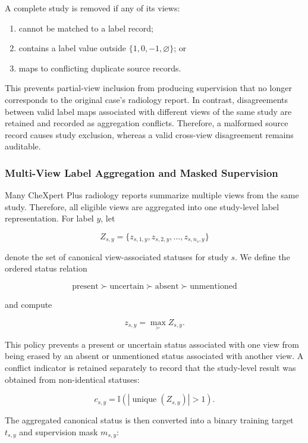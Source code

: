 A complete study is removed if any of its views:

\begin{enumerate}
    \item cannot be matched to a label record;
    \item contains a label value outside $\{1,0,-1,\varnothing\}$; or
    \item maps to conflicting duplicate source records.
\end{enumerate}

This prevents partial-view inclusion from producing supervision that no longer corresponds to the original case's radiology report. In contrast, disagreements between valid label maps associated with different views of the same study are retained and recorded as aggregation conflicts. Therefore, a malformed source record causes study exclusion, whereas a valid cross-view disagreement remains auditable.

\subsubsection{Multi-View Label Aggregation and Masked Supervision}

Many CheXpert Plus radiology reports summarize multiple views from the same study. Therefore, all eligible views are aggregated into one study-level label representation. For label $y$, let

\[
Z_{s,y}=\{z_{s,1,y},z_{s,2,y},\ldots,z_{s,n_s,y}\}
\]

denote the set of canonical view-associated statuses for study $s$. We define the ordered status relation

\[
\mathrm{present}\succ\mathrm{uncertain}\succ
\mathrm{absent}\succ\mathrm{unmentioned}
\]

and compute

\[
z_{s,y}=\max_{\succ}Z_{s,y}.
\]

This policy prevents a present or uncertain status associated with one view from being erased by an absent or unmentioned status associated with another view. A conflict indicator is retained separately to record that the study-level result was obtained from non-identical statuses:

\[
c_{s,y}
=
\mathbb{I}\!\left(
\left|\operatorname{unique}(Z_{s,y})\right|>1
\right).
\]

The aggregated canonical status is then converted into a binary training target $t_{s,y}$ and supervision mask $m_{s,y}$:

